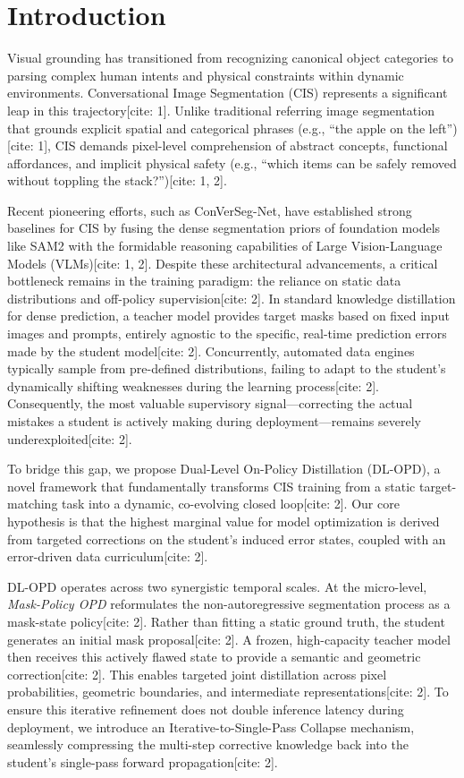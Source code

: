 \section{Introduction}
\label{sec:intro}

Visual grounding has transitioned from recognizing canonical object categories to parsing complex human intents and physical constraints within dynamic environments. Conversational Image Segmentation (CIS) represents a significant leap in this trajectory[cite: 1]. Unlike traditional referring image segmentation that grounds explicit spatial and categorical phrases (e.g., ``the apple on the left'')[cite: 1], CIS demands pixel-level comprehension of abstract concepts, functional affordances, and implicit physical safety (e.g., ``which items can be safely removed without toppling the stack?'')[cite: 1, 2].

Recent pioneering efforts, such as ConVerSeg-Net, have established strong baselines for CIS by fusing the dense segmentation priors of foundation models like SAM2 with the formidable reasoning capabilities of Large Vision-Language Models (VLMs)[cite: 1, 2]. Despite these architectural advancements, a critical bottleneck remains in the training paradigm: the reliance on static data distributions and off-policy supervision[cite: 2]. In standard knowledge distillation for dense prediction, a teacher model provides target masks based on fixed input images and prompts, entirely agnostic to the specific, real-time prediction errors made by the student model[cite: 2]. Concurrently, automated data engines typically sample from pre-defined distributions, failing to adapt to the student's dynamically shifting weaknesses during the learning process[cite: 2]. Consequently, the most valuable supervisory signal—correcting the actual mistakes a student is actively making during deployment—remains severely underexploited[cite: 2].

To bridge this gap, we propose Dual-Level On-Policy Distillation (DL-OPD), a novel framework that fundamentally transforms CIS training from a static target-matching task into a dynamic, co-evolving closed loop[cite: 2]. Our core hypothesis is that the highest marginal value for model optimization is derived from targeted corrections on the student's induced error states, coupled with an error-driven data curriculum[cite: 2].

DL-OPD operates across two synergistic temporal scales. At the micro-level, \textit{Mask-Policy OPD} reformulates the non-autoregressive segmentation process as a mask-state policy[cite: 2]. Rather than fitting a static ground truth, the student generates an initial mask proposal[cite: 2]. A frozen, high-capacity teacher model then receives this actively flawed state to provide a semantic and geometric correction[cite: 2]. This enables targeted joint distillation across pixel probabilities, geometric boundaries, and intermediate representations[cite: 2]. To ensure this iterative refinement does not double inference latency during deployment, we introduce an Iterative-to-Single-Pass Collapse mechanism, seamlessly compressing the multi-step corrective knowledge back into the student's single-pass forward propagation[cite: 2].

